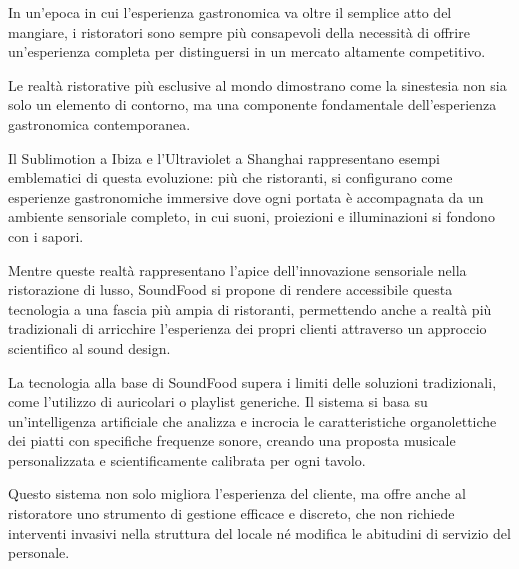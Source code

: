 In un'epoca in cui l'esperienza gastronomica va oltre il semplice atto del mangiare, i ristoratori sono sempre più consapevoli della necessità di offrire un'esperienza completa per distinguersi in un mercato altamente competitivo.

Le realtà ristorative più esclusive al mondo dimostrano come la sinestesia non sia solo un elemento di contorno, ma una componente fondamentale dell'esperienza gastronomica contemporanea.

Il Sublimotion a Ibiza e l'Ultraviolet a Shanghai rappresentano esempi emblematici di questa evoluzione: più che ristoranti, si configurano come esperienze gastronomiche immersive dove ogni portata è accompagnata da un ambiente sensoriale completo, in cui suoni, proiezioni e illuminazioni si fondono con i sapori.

Mentre queste realtà rappresentano l'apice dell'innovazione sensoriale nella ristorazione di lusso, SoundFood si propone di rendere accessibile questa tecnologia a una fascia più ampia di ristoranti, permettendo anche a realtà più tradizionali di arricchire l'esperienza dei propri clienti attraverso un approccio scientifico al sound design.

La tecnologia alla base di SoundFood supera i limiti delle soluzioni tradizionali, come l'utilizzo di auricolari o playlist generiche. Il sistema si basa su un'intelligenza artificiale che analizza e incrocia le caratteristiche organolettiche dei piatti con specifiche frequenze sonore, creando una proposta musicale personalizzata e scientificamente calibrata per ogni tavolo.

Questo sistema non solo migliora l'esperienza del cliente, ma offre anche al ristoratore uno strumento di gestione efficace e discreto, che non richiede interventi invasivi nella struttura del locale né modifica le abitudini di servizio del personale.